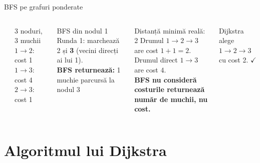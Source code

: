 \documentclass[10pt]{beamer}
\begin{document}
\begin{frame}{BFS pe grafuri ponderate}
  \begin{columns}[T]
    \vspace{4pt}
    \begin{center}
    \end{center}
    \begin{block}{3 noduri, 3 muchii}
      $1\!\to\!2$: cost 1 \\
      $1\!\to\!3$: cost 4 \\
      $2\!\to\!3$: cost 1
    \end{block}
    \begin{block}{BFS din nodul 1}
      Runda 1: marchează 2 și \textbf{3} (vecini direcți ai lui 1).\\
      \textbf{BFS returnează:} 1 muchie parcursă la nodul 3
    \end{block}
    \begin{alertblock}{Distanță minimă reală: 2}
      Drumul $1\!\to\!2\!\to\!3$ are cost $1+1=2$.\\
      Drumul direct $1\!\to\!3$ are cost $4$.\\
      \textbf{BFS nu consideră costurile \textemdash{} returnează număr de muchii, nu cost.}
    \end{alertblock}
    \smallskip
    Dijkstra alege $1\!\to\!2\!\to\!3$ cu cost 2. $\checkmark$
  \end{columns}
\end{frame}

\section{Algoritmul lui Dijkstra}
\end{document}
